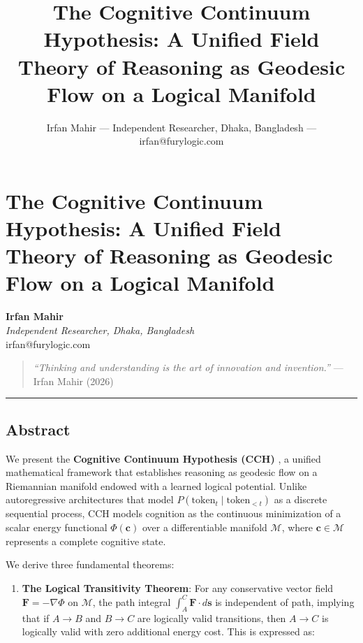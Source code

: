 \documentclass[
  11pt,
  a4paper,
]{article}
\title{The Cognitive Continuum Hypothesis: A Unified Field Theory of
Reasoning as Geodesic Flow on a Logical Manifold}
\author{Irfan Mahir --- Independent Researcher, Dhaka, Bangladesh ---
irfan@furylogic.com}
\date{}
\providecommand{\tightlist}{%
  \setlength{\itemsep}{0pt}\setlength{\parskip}{0pt}}
\begin{document}
\maketitle

{
\hypersetup{linkcolor=}
\setcounter{tocdepth}{3}
\tableofcontents
}
\section{The Cognitive Continuum Hypothesis: A Unified Field Theory of
Reasoning as Geodesic Flow on a Logical
Manifold}\label{the-cognitive-continuum-hypothesis-a-unified-field-theory-of-reasoning-as-geodesic-flow-on-a-logical-manifold}

\textbf{Irfan Mahir}\\
\emph{Independent Researcher, Dhaka, Bangladesh}\\
irfan@furylogic.com

\begin{quote}
\emph{``Thinking and understanding is the art of innovation and
invention.''} --- Irfan Mahir (2026)
\end{quote}

\begin{center}\rule{0.5\linewidth}{0.5pt}\end{center}

\subsection{Abstract}\label{abstract}

We present the \textbf{Cognitive Continuum Hypothesis (CCH)} , a unified
mathematical framework that establishes reasoning as geodesic flow on a
Riemannian manifold endowed with a learned logical potential. Unlike
autoregressive architectures that model
\(P(\text{token}_t \mid \text{token}_{<t})\) as a discrete sequential
process, CCH models cognition as the continuous minimization of a scalar
energy functional \(\Phi(\mathbf{c})\) over a differentiable manifold
\(\mathcal{M}\), where \(\mathbf{c} \in \mathcal{M}\) represents a
complete cognitive state.

We derive three fundamental theorems:

\begin{enumerate}
\def\labelenumi{\arabic{enumi}.}
\tightlist
\item
  \textbf{The Logical Transitivity Theorem}: For any conservative vector
  field \(\mathbf{F} = -\nabla\Phi\) on \(\mathcal{M}\), the path
  integral \(\int_A^C \mathbf{F} \cdot d\mathbf{s}\) is independent of
  path, implying that if \(A \to B\) and \(B \to C\) are logically valid
  transitions, then \(A \to C\) is logically valid with zero additional
  energy cost. This is expressed as:
\end{enumerate}
\end{document}
